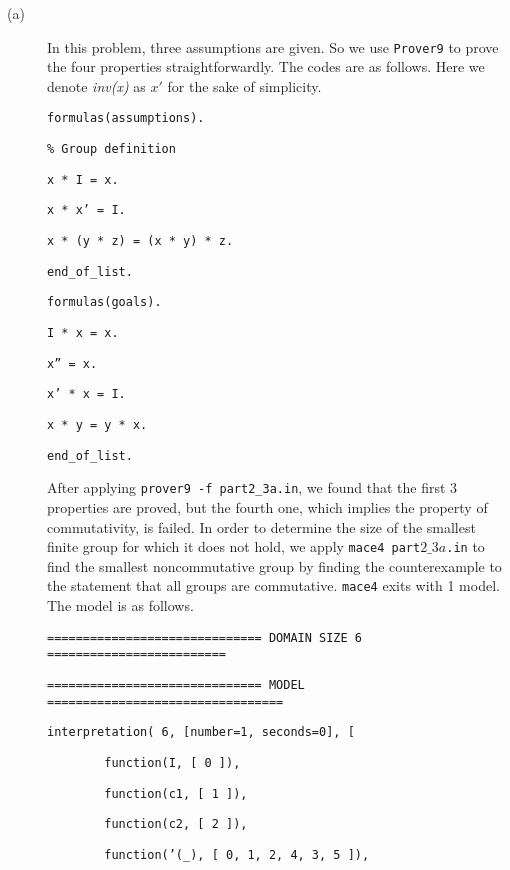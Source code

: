 \begin{description}
  \item[(a)] In this problem, three assumptions are given. So we use {\tt Prover9} to prove the four properties straightforwardly. The codes are as follows. Here we denote \emph{inv(x)} as $x'$ for the sake of simplicity.

\vspace{3mm}

{\footnotesize

{\tt formulas(assumptions).}

{\tt \% Group definition}

{\tt x * I = x.}

{\tt x * x' = I.}

{\tt x * (y * z) = (x * y) * z.}

{\tt end\_of\_list.}

{\tt formulas(goals).}

{\tt I * x = x.}

{\tt x'' = x.}

{\tt x' * x = I.}

{\tt x * y = y * x.}

{\tt end\_of\_list.}

}

\vspace{2mm}

  After applying {\tt prover9 -f part2\_3a.in}, we found that the first 3 properties are proved, but the fourth one, which implies the property of commutativity, is failed. In order to determine the size of the smallest finite group for which it does not hold, we apply {\tt mace4 part$2\_3a$.in} to find the smallest noncommutative group by finding the counterexample to the statement that all groups are commutative. {\tt mace4} exits with 1 model. The model is as follows.

\vspace{3mm}

{\tt ============================== DOMAIN SIZE 6 =========================}

{\tt ============================== MODEL =================================}

{\tt interpretation( 6, [number=1, seconds=0], [}

{\tt \ \ \ \ \ \ \ \ function(I, [ 0 ]),}

{\tt \ \ \ \ \ \ \ \ function(c1, [ 1 ]),}

{\tt \ \ \ \ \ \ \ \ function(c2, [ 2 ]),}

{\tt \ \ \ \ \ \ \ \ function('(\_), [ 0, 1, 2, 4, 3, 5 ]),}


\end{description}
